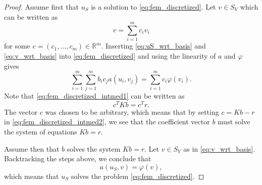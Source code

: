 \documentclass[english, 12pt, a4paper, sci, utf8, a-2b, online]{aaltothesis}
\theoremstyle{definition}
\theoremstyle{plain}
\numberwithin{equation}{section}
\begin{document}
\begin{proof}
    Assume first that $u_S$ is a solution to \eqref{eq:fem_discretized}.
    Let $v \in S_V$ which can be written as
    \begin{equation}
        \label{eq:v_wrt_basis}
        v = \sum_{i=1}^{m} c_i v_i
    \end{equation}
    for some $c = (c_1,\dotsc,c_m) \in \mathbb{R}^m$.
    Inserting \eqref{eq:uS_wrt_basis} and \eqref{eq:v_wrt_basis} into
    \eqref{eq:fem_discretized} and using the linearity of $a$ and $\varphi$
    gives
    \begin{equation}
        \label{eq:fem_discretized_intmed1}
        \sum_{i=1}^{m} \sum_{j=1}^{m} b_i c_j a(u_i,v_j)
        = \sum_{i=1}^{m} c_i \varphi(v_i).
    \end{equation}
    Note that \eqref{eq:fem_discretized_intmed1} can be written as
    \begin{equation}
        \label{eq:fem_discretized_intmed2}
        c^T K b = c^T r.
    \end{equation}
    The vector $c$ was chosen to be arbitrary, which means that by setting
    $c = Kb - r$ in \eqref{eq:fem_discretized_intmed2},
    we see that the coefficient vector $b$
    must solve the system of equations $Kb = r$.

    Assume then that $b$ solves the system $Kb = r$.
    Let $v \in S_V$ as in \eqref{eq:v_wrt_basis}.
    Backtracking the steps above, we conclude that
    \begin{equation*}
        a(u_S,v) = \varphi(v),
    \end{equation*}
    which means that $u_S$ solves the problem \eqref{eq:fem_discretized}.
\end{proof}
\end{document}

